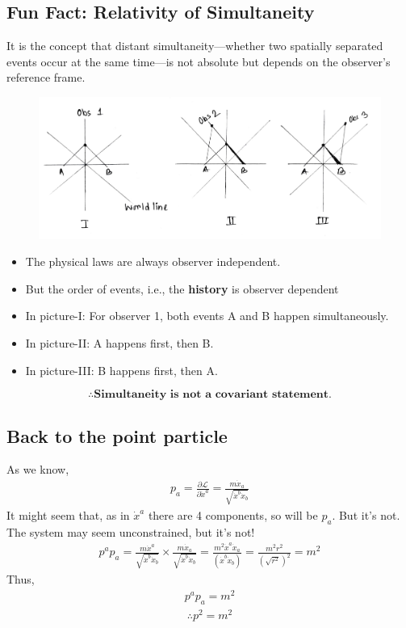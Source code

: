 \documentclass[14pt]{article} %
\begin{document}
\subsection*{Fun Fact: Relativity of Simultaneity}
It is the concept that distant simultaneity—whether two spatially separated events occur at the same time—is not absolute but depends on the observer's reference frame.
\begin{figure}[H]
\centering
\includegraphics[width=0.9\linewidth]{L0_1 (1).jpg}
\caption*{}
\end{figure}
\vspace{-1.5cm}
\begin{itemize}
    \item The physical laws are always observer independent.
    \item But the order of events, i.e., the \textbf{history} is observer dependent
    \item In picture-I: For observer 1, both events A and B happen simultaneously.
    \item In picture-II: A happens first, then B.
    \item In picture-III: B happens first, then A.
\end{itemize}
$$ \boxed{\therefore \textbf{Simultaneity is not a covariant statement.}} $$
\subsection*{Back to the point particle}
As we know,
\begin{align*}
p_a = \frac{\partial \mathcal{L}}{\partial \dot{x}^a} = \frac{m \dot{x}_a}{\sqrt{\dot{x}^b \dot{x}_b}}
\end{align*}
It might seem that, as in $\dot{x}^a$ there are 4 components, so will be $p_a$. But it's not. The system may seem unconstrained, but it's not!
\begin{align*}
p^a p_a = \frac{m \dot{x}^a}{\sqrt{\dot{x}^b \dot{x}_b}} \times \frac{m \dot{x}_a}{\sqrt{\dot{x}^b \dot{x}_b}} = \frac{m^2 \dot{x}^a \dot{x}_a}{(\dot{x}^b \dot{x}_b)} = \frac{m^2r^2}{(\sqrt{r^2})^2} = m^2
\end{align*}
Thus,
\begin{align*}
p^a p_a = m^2
\end{align*}
\begin{align*}
\therefore p^2 = m^2 \tag{5} \label{eq:5}
\end{align*}
\end{document}
